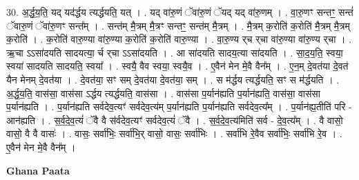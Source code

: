 \documentclass[17pt]{extarticle}
\begin{document}
30. अ॒र्द्ध॒य॒ति॒ यद् यद॑र्द्धय त्यर्द्धयति॒ यत् । . यद् वा॑रु॒णं ॅवा॑रु॒णं ॅयद् यद् वा॑रु॒णम् । . वा॒रु॒णꣳ सन्तꣳ॒॒ सन्तं॑ ॅवारु॒णं ॅवा॑रु॒णꣳ सन्त᳚म् । . सन्त॑म् मै॒त्रम् मै॒त्रꣳ सन्तꣳ॒॒ सन्त॑म् मै॒त्रम् । . मै॒त्रम् क॒रोति॑ क॒रोति॑ मै॒त्रम् मै॒त्रम् क॒रोति॑ । . क॒रोति॑ वारु॒ण्या वा॑रु॒ण्या क॒रोति॑ क॒रोति॑ वारु॒ण्या । . वा॒रु॒ण्य र्‌च र्‌चा वा॑रु॒ण्या वा॑रु॒ण्य र्‌चा । . ऋ॒चा ऽऽसा॑दयति सादयत्या॒ ‌र्च र्‌चा ऽऽसा॑दयति । . आ सा॑दयति सादय॒त्या सा॑दयति । . सा॒द॒य॒ति॒ स्वया॒ स्वया॑ सादयति सादयति॒ स्वया᳚ । . स्वयै॒ वैव स्वया॒ स्वयै॒व । . ए॒वैन॑ मेन मे॒वै वैन᳚म् । . ए॒न॒म् दे॒वत॑या दे॒वत॑ यैन मेनम् दे॒वत॑या । . दे॒वत॑या॒ सꣳ सम् दे॒वत॑या दे॒वत॑या॒ सम् । . स म॑र्द्धय त्यर्द्धयति॒ सꣳ स म॑र्द्धयति । . अ॒र्द्ध॒य॒ति॒ वास॑सा॒ वास॑सा ऽर्द्धय त्यर्द्धयति॒ वास॑सा । . वास॑सा प॒र्यान॑ह्यति प॒र्यान॑ह्यति॒ वास॑सा॒ वास॑सा प॒र्यान॑ह्यति । . प॒र्यान॑ह्यति सर्वदेव॒त्यꣳ॑ सर्वदेव॒त्य॑म् प॒र्यान॑ह्यति प॒र्यान॑ह्यति सर्वदेव॒त्य᳚म् । . प॒र्यान॑ह्य॒तीति॑ परि - आन॑ह्यति । . स॒र्व॒दे॒व॒त्यं॑ ॅवै वै स॑र्वदेव॒त्यꣳ॑ सर्वदेव॒त्यं॑ ॅवै । . स॒र्व॒दे॒व॒त्य॑मिति॑ सर्व - दे॒व॒त्य᳚म् । . वै वासो॒ वासो॒ वै वै वासः॑ । . वासः॒ सर्वा॑भिः॒ सर्वा॑भि॒र् वासो॒ वासः॒ सर्वा॑भिः । . सर्वा॑भि रे॒वैव सर्वा॑भिः॒ सर्वा॑भि रे॒व । . ए॒वैन॑ मेन मे॒वै वैन᳚म् । \newline

\textbf{Ghana Paata } \newline
\end{document}
